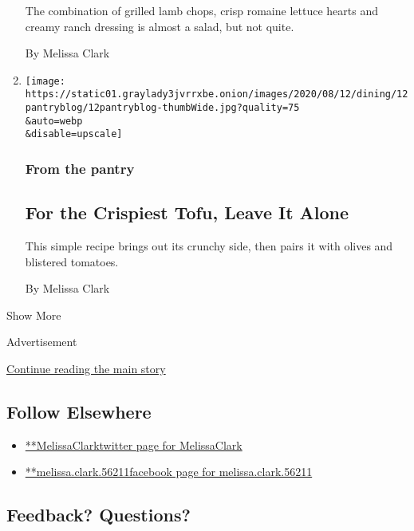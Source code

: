 \begin{enumerate}
  The combination of grilled lamb chops, crisp romaine lettuce hearts
  and creamy ranch dressing is almost a salad, but not quite.

  By Melissa Clark
\item
  \href{/2020/08/12/dining/crisp-tofu-recipe.html}{}

  \texttt{[image: https://static01.graylady3jvrrxbe.onion/images/2020/08/12/dining/12pantryblog/12pantryblog-thumbWide.jpg?quality=75\\\&auto=webp\\\&disable=upscale]}

  \hypertarget{from-the-pantry-4}{%
  \subsubsection{From the pantry}\label{from-the-pantry-4}}

  \hypertarget{for-the-crispiest-tofu-leave-it-alone}{%
  \subsection{For the Crispiest Tofu, Leave It
  Alone}\label{for-the-crispiest-tofu-leave-it-alone}}

  This simple recipe brings out its crunchy side, then pairs it with
  olives and blistered tomatoes.

  By Melissa Clark
\end{enumerate}

Show More

Advertisement

\protect\hyperlink{after-mid2}{Continue reading the main story}

\hypertarget{follow-elsewhere}{%
\subsection{Follow Elsewhere}\label{follow-elsewhere}}

\begin{itemize}
\tightlist
\item
  \href{https://twitter.com/MelissaClark}{**MelissaClarktwitter page for
  MelissaClark}
\item
  \href{https://www.facebookcorewwwi.onion/melissa.clark.56211}{**melissa.clark.56211facebook
  page for melissa.clark.56211}
\end{itemize}

\hypertarget{feedback-questions}{%
\subsection{Feedback? Questions?}\label{feedback-questions}}

